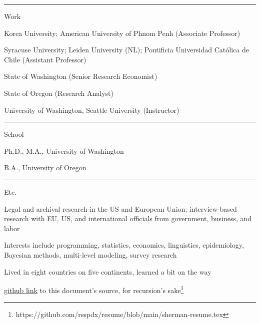 \documentclass[letterpaper, english, 11pt]{article}
\newenvironment{packed_itemize}{
	\begin{itemize}
		\setlength{\itemsep}{1pt}
		\setlength{\parskip}{2pt}
		\setlength{\parsep}{2pt}
	} {\end{itemize}
}
\begin{document}
\vspace{6pt}
\hrule

Work

\begin{footnotesize}
	\begin{packed_itemize}
		\item Korea University; American University of Phnom Penh (Associate Professor)
		\item Syracuse University; Leiden University (NL); Pontificia Universidad Cat{\'o}lica de Chile (Assistant Professor)
		\item State of Washington (Senior Research Economist)
		\item State of Oregon (Research Analyst)
		\item University of Washington, Seattle University (Instructor)
	\end{packed_itemize}
\end{footnotesize}

\vspace{6pt}
\hrule

School

\begin{footnotesize}
	\begin{packed_itemize}
		\item Ph.D., M.A., University of Washington
		\item B.A., University of Oregon
	\end{packed_itemize}
\end{footnotesize}

\vspace{6pt}
\hrule

Etc.

\begin{footnotesize}
	\begin{packed_itemize}
		\item Legal and archival research in the US and European Union; interview-based research with EU, US, and international officials from government, business, and labor 
		\item Interests include programming, statistics, economics, linguistics, epidemiology, Bayesian methods, multi-level modeling, survey research
		\item Lived in eight countries on five continents, learned a bit on the way
		\item \href{https://github.com/rsspdx/resume/blob/main/sherman-resume.tex}{github link} to this document's source, for recursion's sake\footnote{https://github.com/rsspdx/resume/blob/main/sherman-resume.tex}
	\end{packed_itemize}
\end{footnotesize} 
\end{document}
